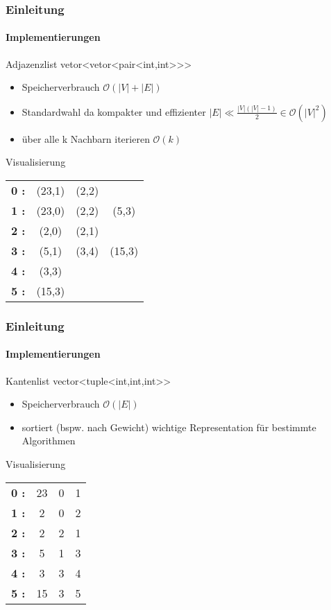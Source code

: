 \begin{frame}
    \frametitle{Einleitung}
    \framesubtitle{Implementierungen}
    \begin{KITexampleblock}{Adjazenzlist}
    vetor<vetor<pair<int,int>{}>{}>
    \begin{itemize}
        \item Speicherverbrauch \( \mathcal{O}(|V|+|E|)\)
        \item Standardwahl da kompakter und effizienter \( |E| \ll \frac{|V| (|V| - 1)}{2} \in \mathcal{O}(|V|^2)\)
        \item über alle k Nachbarn iterieren \( \mathcal{O}(k)\)
    \end{itemize}
    \end{KITexampleblock}
    \vspace{0.001em}
    \begin{KITinfoblock}{Visualisierung}
    \begin{tabular}{l c c c}
        \textbf{0 :  } & (23,1) & (2,2) \\
        \textbf{1 :  } & (23,0) & (2,2) & (5,3) \\
        \textbf{2 :  } & (2,0) & (2,1) \\
        \textbf{3 :  } & (5,1) & (3,4) & (15,3) \\
        \textbf{4 :  } & (3,3) \\
        \textbf{5 :  } & (15,3) \\
    \end{tabular}
    \end{KITinfoblock}
\end{frame}

\begin{frame}
    \frametitle{Einleitung}
    \framesubtitle{Implementierungen}
    \begin{KITexampleblock}{Kantenlist}
    vector<tuple<int,int,int>{}>
    \begin{itemize}
        \item Speicherverbrauch \( \mathcal{O}(|E|)\)
        \item sortiert (bspw. nach Gewicht) wichtige Representation für bestimmte Algorithmen
    \end{itemize}
    \end{KITexampleblock}
    \vspace{0.001em}
    \begin{KITinfoblock}{Visualisierung}
    \begin{tabular}{l c c c}
        \textbf{0 :  } & 23 & 0 & 1 \\
        \textbf{1 :  } & 2 & 0 & 2 \\
        \textbf{2 :  } & 2 & 2 & 1 \\
        \textbf{3 :  } & 5 & 1 & 3 \\
        \textbf{4 :  } & 3 & 3 & 4 \\
        \textbf{5 :  } & 15 & 3 & 5 \\
    \end{tabular}
    \end{KITinfoblock}
\end{frame}
